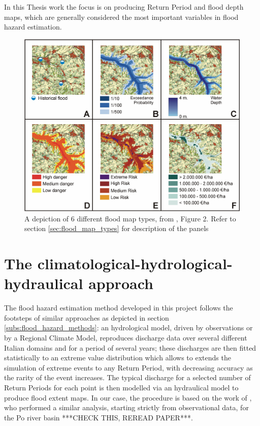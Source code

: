 In this Thesis work the focus is on producing Return Period and flood depth maps, which are generally considered the most important variables in flood hazard estimation.

\begin{figure}[h]
    \centering
    \includegraphics[width=\textwidth]{figures/flood_map_types}
    \decoRule
    \caption[Flood map types]{A depiction of 6 different flood map types, from  \cite{DeMoel2009}, Figure 2. Refer to section \ref{sec:flood_map_types} for description of the panels}
    \label{fig:flood_map_types}
\end{figure}

\section{The climatological-hydrological-hydraulical approach}
The flood hazard estimation method developed in this project follows the footsteps of similar approaches as depicted in section \ref{subs:flood_hazard_methods}: an hydrological model, driven by observations or by a Regional Climate Model, reproduces discharge data over several different Italian domains and for a period of several years; these discharges are then fitted statistically to an extreme value distribution which allows to extends the simulation of extreme events to any Return Period, with decreasing accuracy as the rarity of the event increases. The typical discharge for a selected number of Return Periods for each point is then modelled via an hydraulical model to produce flood extent maps. In our case, the procedure is based on the work of \cite{PAPER_MAIONE?}, who performed a similar analysis, starting strictly from observational data, for the Po river basin ***CHECK THIS, REREAD PAPER***.

